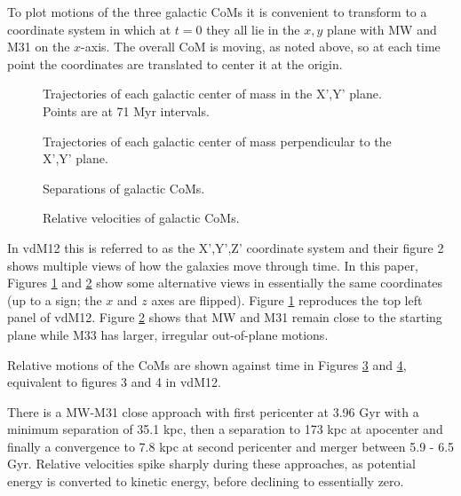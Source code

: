 \documentclass[twocolumn]{aastex63}
\begin{document}
To plot motions of the three galactic CoMs it is convenient to transform to a coordinate system in which at $t=0$ they all lie in the $x,y$ plane with MW and M31 on the $x$-axis. The overall CoM is moving, as noted above, so at each time point the coordinates are translated to center it at the origin.

\begin{figure}[htb!]
	\caption{Trajectories of each galactic center of mass in the X',Y' plane. Points are at 71 Myr intervals.
		\label{fig:traj_xy}}
\end{figure}

\begin{figure}[htb!]
	\caption{Trajectories of each galactic center of mass perpendicular to the X',Y' plane.
		\label{fig:traj_z}}
\end{figure}

\begin{figure}[hbt!]
	\caption{Separations of galactic CoMs.
		\label{fig:rel_sep}}
\end{figure}

\begin{figure}[hbt!]
	\caption{Relative velocities of galactic CoMs.
		\label{fig:rel_vel}}
\end{figure}



In vdM12 this is referred to as the X',Y',Z' coordinate system and their figure 2 shows multiple views of how the galaxies move through time. In this paper, Figures \ref{fig:traj_xy} and  \ref{fig:traj_z} show some alternative views in essentially the same coordinates (up to a sign; the $x$ and $z$ axes are flipped). Figure \ref{fig:traj_xy} reproduces the top left panel of vdM12. Figure \ref{fig:traj_z} shows that MW and M31 remain close to the starting plane while M33 has larger, irregular out-of-plane motions.

Relative motions of the CoMs are shown against time in Figures \ref{fig:rel_sep} and \ref{fig:rel_vel}, equivalent to figures 3 and 4 in vdM12.


There is a MW-M31 close approach with first pericenter at 3.96 Gyr with a minimum separation of 35.1 kpc, then a separation to 173 kpc at apocenter and finally a convergence to 7.8 kpc at second pericenter and merger between 5.9 - 6.5 Gyr. Relative velocities spike sharply during these approaches, as potential energy is converted to kinetic energy, before declining to essentially zero.
\end{document}
